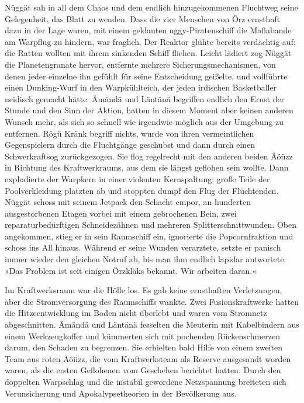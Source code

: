 Nüggät sah in all dem Chaos und dem endlich hinzugekommenen Fluchtweg seine Gelegenheit, das Blatt zu wenden. Dass die vier Menschen von Örz ernsthaft dazu in der Lage waren, mit einem geklauten uggy-Piratenschiff die Mafiabande am Warpflug zu hindern, war fraglich. Der Reaktor glühte bereits verdächtig auf; die Ratten wollten mit ihrem sinkenden Schiff fliehen. Leicht lädiert zog Nüggät die Planetengranate hervor, entfernte mehrere Sicherungsmechanismen, von denen jeder einzelne ihn gefühlt für seine Entscheidung geißelte, und vollführte einen Dunking-Wurf in den Warpkühlteich, der jeden irdischen Basketballer neidisch gemacht hätte. Ämändä und Läntänä begriffen endlich den Ernst der Stunde und den Sinn der Aktion, hatten in diesem Moment aber keinen anderen Wunsch mehr, als sich so schnell wie irgendwie möglich aus der Umgebung zu entfernen. Rögü Kränk begriff nichts, wurde von ihren vermeintlichen Gegenspielern durch die Fluchtgänge geschubst und dann durch einen Schwerkraftsog zurückgezogen. Sie flog regelrecht mit den anderen beiden Äöüzz in Richtung des Kraftwerkraums, aus dem sie längst geflohen sein wollte. Dann explodierte der Warpkern in einer violenten Kernspaltung; große Teile der Poolverkleidung platzten ab und stoppten dumpf den Flug der Flüchtenden. Nüggät schoss mit seinem Jetpack den Schacht empor, an hunderten ausgestorbenen Etagen vorbei mit einem gebrochenen Bein, zwei reparaturbedürftigen Schneidezähnen und mehreren Splitterschnittwunden. Oben angekommen, stieg er in sein Raumschiff ein, ignorierte die Popcornfraktion und schoss ins All hinaus. Während er seine Wunden verarztete, setzte er panisch immer wieder den gleichen Notruf ab, bis man ihm endlich lapidar antwortete: »Das Problem ist seit einigen Örzkläks bekannt. Wir arbeiten daran.«

Im Kraftwerksraum war die Hölle los. Es gab keine ernsthaften Verletzungen, aber die Stromversorgung des Raumschiffs wankte. Zwei Fusionskraftwerke hatten die Hitzeentwicklung im Boden nicht überlebt und waren vom Stromnetz abgeschnitten. Ämändä und Läntänä fesselten die Meuterin mit Kabelbindern aus einem Werkzeugkoffer und kümmerten sich mit pochenden Rückenschmerzen darum, den Schaden zu begrenzen. Sie erhielten bald Hilfe von einem zweiten Team aus roten Äöüzz, die vom Kraftwerksteam als Reserve ausgesandt worden waren, als die ersten Geflohenen vom Geschehen berichtet hatten. Durch den doppelten Warpschlag und die instabil gewordene Netzspannung breiteten sich Verunsicherung und Apokalypsetheorien in der Bevölkerung aus.


